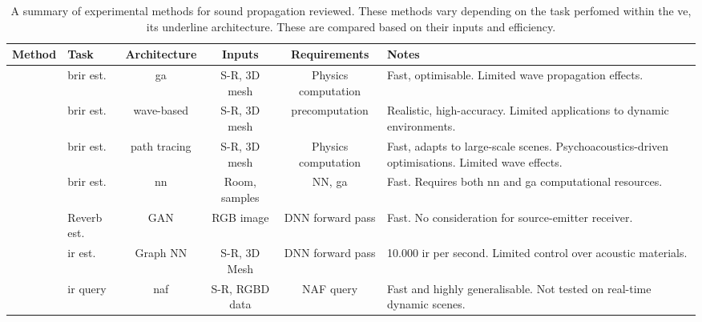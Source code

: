 \begin{landscape}
    \begin{table}[tbp]
        \centering
        \caption{A summary of experimental methods for sound propagation reviewed. These methods vary depending on the task perfomed within the \acrshort{ve}, its underline architecture. These are compared based on their inputs and efficiency.}
            
            \begin{tabularx}{\linewidth}{llcccX}
                \toprule
                Method                                            & Task                     & Architecture   & Inputs                        & Requirements        & Notes \\ \midrule
                \cite{schroder2011physically} & \acrshort{brir} est.     & \acrshort{ga}  & S-R, 3D mesh   & Physics computation              & Fast, optimisable. Limited wave propagation effects. \\
                \cite{mehra2015wave}                              & \acrshort{brir} est.     & wave-based     & S-R, 3D mesh                  & precomputation      & Realistic, high-accuracy. Limited applications to dynamic environments. \\
                \cite{schissler2016interactive}                   & \acrshort{brir} est.     & path tracing   & S-R, 3D mesh                  & Physics computation & Fast, adapts to large-scale scenes. Psychoacoustics-driven optimisations. Limited wave effects. \\
                \cite{tang2020scene}                              & \acrshort{brir} est.     & \acrshort{nn}  & Room, samples\footnotemark[1] & NN, \acrshort{ga}   & Fast. Requires both \acrshort{nn} and \acrshort{ga} computational resources.\\
                \cite{Singh_2021_ICCV}                            & Reverb est.              & GAN            & RGB image                     & DNN forward pass    & Fast. No consideration for source-emitter receiver. \\
                \cite{ratnarajah2022mesh2ir}                      & \acrshort{ir} est.       & Graph NN       & S-R, 3D Mesh                  & DNN forward pass    & 10.000 \acrshort{ir} per second\footnotemark[2]. Limited control over acoustic materials.\\
                \cite{liang2023neural}                            & \acrshort{ir} query      & \acrshort{naf} & S-R, RGBD data                & NAF query           & Fast and highly generalisable. Not tested on real-time dynamic scenes.\\ 

\end{tabularx}
\end{table}
\end{landscape}
